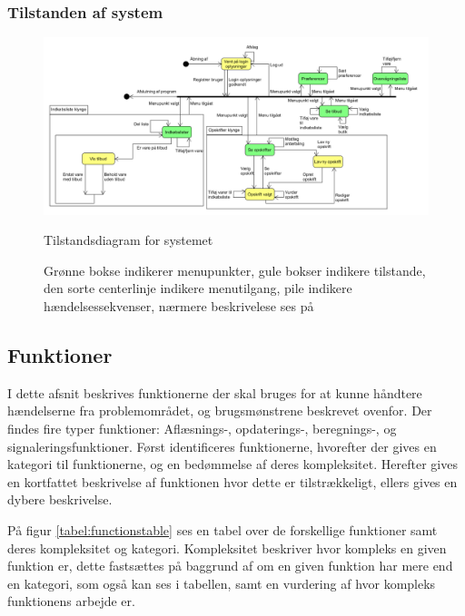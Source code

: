 

\subsubsection*{Tilstanden af system}
\begin{figure}
	\centering
	\includegraphics[scale=0.6, angle=90]{images/Diagrams/Tilstandsdiagram.PNG}
	\caption{Tilstandsdiagram for systemet}
	\caption{Grønne bokse indikerer menupunkter, gule bokser indikere tilstande, den sorte centerlinje indikere menutilgang, pile indikere hændelsessekvenser, nærmere beskrivelese ses på }\label{tilstandsdiagram}
\end{figure}



\subsection{Funktioner}\label{subsec:funktioner}

I dette afsnit beskrives funktionerne der skal bruges for at kunne håndtere hændelserne fra problemområdet, og brugsmønstrene beskrevet ovenfor.
Der findes fire typer funktioner: Aflæsnings-, opdaterings-, beregnings-, og signaleringsfunktioner.\citep{OOA&D2001}
Først identificeres funktionerne, hvorefter der gives en kategori til funktionerne, og en bedømmelse af deres kompleksitet. Herefter gives en kortfattet beskrivelse af funktionen hvor dette er tilstrækkeligt, ellers gives en dybere beskrivelse.

På figur \ref{tabel:functionstable} ses en tabel over de forskellige funktioner samt deres kompleksitet og kategori.
Kompleksitet beskriver hvor kompleks en given funktion er, dette fastsættes på baggrund af om en given funktion har mere end en kategori, som også kan ses i tabellen, samt en vurdering af hvor kompleks funktionens arbejde er.

